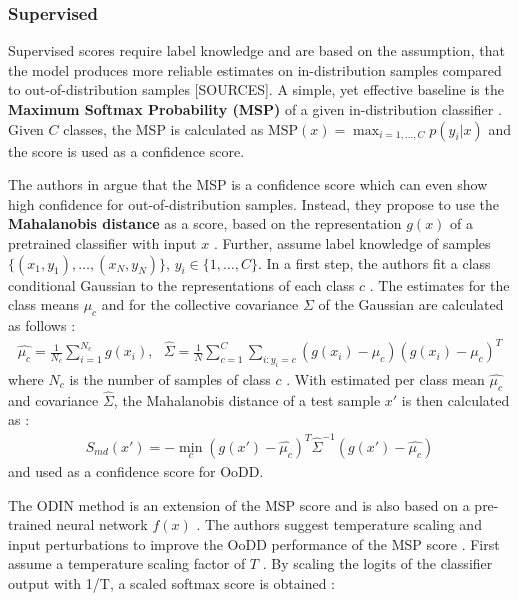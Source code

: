 \subsubsection*{Supervised}
Supervised scores require label knowledge and are based on the assumption, that the model produces more reliable estimates on in-distribution samples compared to out-of-distribution samples [SOURCES].
A simple, yet effective baseline is the \textbf{Maximum Softmax Probability (MSP)} of a given in-distribution classifier \citep{Hendrycks2016a}.
Given $C$ classes, the MSP is calculated as $\text{MSP}(x)=\max_{i=1,\dots,C}p(y_i|x)$ and the score is used as a confidence score.
\par
The authors in \citep{Lee2018} argue that the MSP is a confidence score which can even show high confidence for out-of-distribution samples.
Instead, they propose to use the \textbf{Mahalanobis distance} as a score, based on the representation $g(x)$ of a pretrained classifier with input $x$ \citep{Lee2018}.
Further, assume label knowledge of samples $\{(x_1,y_1),\dots, (x_N,y_N)\}$, $y_i \in \{1,\dots,C\}$.
In a first step, the authors fit a class conditional Gaussian to the representations of each class $c$ \citep{Lee2018}.
The estimates for the class means $\mu_c$ and for the collective covariance $\Sigma$ of the Gaussian are calculated as follows \citep{Lee2018}:
\begin{align}
	\hat{\mu_c} = \frac{1}{N_c}\sum_{i=1}^{N_c}g(x_i), \hspace{8pt} \hat{\Sigma} = \frac{1}{N}\sum_{c=1}^{C}\sum_{i: y_i=c}(g(x_i)-\mu_c)(g(x_i)-\mu_c)^T
\end{align}
where $N_c$ is the number of samples of class $c$ \citep{Lee2018}.
With estimated per class mean $\hat{\mu_c}$ and covariance $\hat{\Sigma}$, the Mahalanobis distance of a test sample $x'$ is then calculated as \citep{Lee2018}:
\begin{align}
	S_{md}(x') = - \min_c (g(x')-\hat{\mu_c})^T\hat{\Sigma}^{-1}(g(x')-\hat{\mu_c})
\end{align}
and used as a confidence score for OoDD.
\par
The ODIN method is an extension of the MSP score and is also based on a pre-trained neural network $f(x)$ \citep{Liang2018}.
The authors suggest temperature scaling and input perturbations to improve the OoDD performance of the MSP score \citep{Liang2018}.
First assume a temperature scaling factor of $T$ \citep{Liang2018}.
By scaling the logits of the classifier output with 1/T, a scaled softmax score is obtained \citep{Liang2018}:
